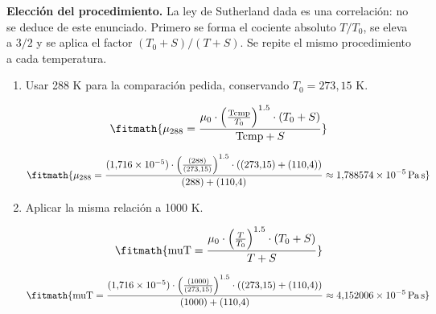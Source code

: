 \noindent\textbf{Elección del procedimiento.} La ley de Sutherland dada es una correlación: no se deduce de este enunciado. Primero se forma el cociente absoluto $T/T_0$, se eleva a $3/2$ y se aplica el factor $(T_0+S)/(T+S)$. Se repite el mismo procedimiento a cada temperatura.

\begin{enumerate}

\item Usar 288 K para la comparación pedida, conservando $T_0=273{,}15$ K.

\[\fitmath{\mu_{288}=\frac{\mu_{0}\cdot {\left(\frac{\mathrm{Tcmp}}{T_{0}}\right)}^{1.5}\cdot \left(T_{0}+S\right)}{\mathrm{Tcmp}+S}}\]

\[\fitmath{\mu_{288}=\frac{(1{,}716\times10^{-5})\cdot {\left(\frac{(288)}{(273{,}15)}\right)}^{1.5}\cdot \left((273{,}15)+(110{,}4)\right)}{(288)+(110{,}4)}\approx 1{,}788574\times10^{-5}\,\mathrm{Pa\,s}}\]

\item Aplicar la misma relación a 1000 K.

\[\fitmath{\mathrm{muT}=\frac{\mu_{0}\cdot {\left(\frac{T}{T_{0}}\right)}^{1.5}\cdot \left(T_{0}+S\right)}{T+S}}\]

\[\fitmath{\mathrm{muT}=\frac{(1{,}716\times10^{-5})\cdot {\left(\frac{(1000)}{(273{,}15)}\right)}^{1.5}\cdot \left((273{,}15)+(110{,}4)\right)}{(1000)+(110{,}4)}\approx 4{,}152006\times10^{-5}\,\mathrm{Pa\,s}}\]

\end{enumerate}
